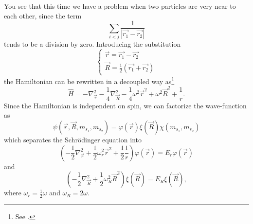 You see that this time we have a problem when two particles are very near to each other, since the term
\begin{equation*}
	\sum_{i<j}\frac{1}{|\vec{r_1}-\vec{r_2}|}
\end{equation*}
tends to be a division by zero. Introducing the substitution
\begin{equation}
\begin{cases}
\vec{r}=\vec{r_1}-\vec{r_2} \\ 
\vec{R}=\frac{1}{2}(\vec{r_1}+\vec{r_2}) 
\end{cases}
\end{equation}
the Hamiltonian can be rewritten in a decoupled way as\footnote{See \cite{Taut1993}.}
\begin{equation}
    \hat{H} = -\nabla_{\vec{r}}^2 - \frac{1}{4}\nabla_{\vec{R}}^2 - \frac{1}{4}\omega^2\vec{r}^2 + \omega^2\vec{R}^2 + \frac{1}{r}.
\end{equation}
Since the Hamiltonian is independent on spin, we can factorize the wave-function as
\begin{equation}
    \psi(\vec{r},\vec{R},m_{s_1},m_{s_2}) = \varphi(\vec{r})\xi(\vec{R})\chi(m_{s_1},m_{s_2})
\end{equation}
which separates the Schr\"{o}dinger equation into
\begin{equation}
    \left( -\frac{1}{2}\nabla_{\vec{r}}^2 + \frac{1}{2}\omega_r^2\vec{r}^2 + \frac{1}{2}\frac{1}{r} \right)\varphi(\vec{r}) = E_r\varphi(\vec{r})
    \label{eq:Seq_relative_distance}
\end{equation}
and
\begin{equation}
    \left( -\frac{1}{2}\nabla_{\vec{R}}^2 + \frac{1}{2}\omega_R^2\vec{R}^2 \right)\xi(\vec{R}) = E_R\xi(\vec{R}),
\end{equation}
where $\omega_r = \frac{1}{2}\omega$ and $\omega_R = 2\omega$.

